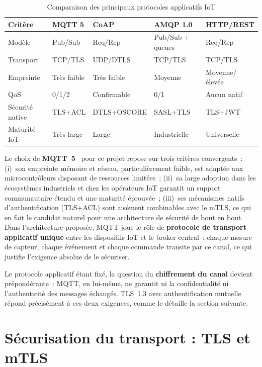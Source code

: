 \begin{table}[!htbp]
\centering
\caption{Comparaison des principaux protocoles applicatifs IoT}
\label{tab:protocoles}
\small
\begin{tabularx}{\linewidth}{|l|X|X|X|X|}
\hline
\textbf{Critère} & \textbf{MQTT 5} & \textbf{CoAP} & \textbf{AMQP 1.0} & \textbf{HTTP/REST} \\
\hline
Modèle & Pub/Sub & Req/Rep & Pub/Sub + queues & Req/Rep \\ \hline
Transport & TCP/TLS & UDP/DTLS & TCP/TLS & TCP/TLS \\ \hline
Empreinte & Très faible & Très faible & Moyenne & Moyenne/élevée \\ \hline
QoS & 0/1/2 & Confirmable & 0/1 & Aucun natif \\ \hline
Sécurité native & TLS+ACL & DTLS+OSCORE & SASL+TLS & TLS+JWT \\ \hline
Maturité IoT & Très large & Large & Industrielle & Universelle \\ \hline
\end{tabularx}
\end{table}

Le choix de \textbf{MQTT~5}~\cite{mqtt5} pour ce projet repose sur trois critères convergents~: (i)~son empreinte mémoire et réseau, particulièrement faible, est adaptée aux microcontrôleurs disposant de ressources limitées~; (ii)~sa large adoption dans les écosystèmes industriels et chez les opérateurs IoT garantit un support communautaire étendu et une maturité éprouvée~; (iii)~ses mécanismes natifs d'authentification (\acs{TLS}+\acs{ACL}) sont aisément combinables avec le mTLS, ce qui en fait le candidat naturel pour une architecture de sécurité de bout en bout. Dans l'architecture proposée, MQTT joue le rôle de \textbf{protocole de transport applicatif unique} entre les dispositifs IoT et le broker central~: chaque mesure de capteur, chaque événement et chaque commande transite par ce canal, ce qui justifie l'exigence absolue de le sécuriser.

Le protocole applicatif étant fixé, la question du \textbf{chiffrement du canal} devient prépondérante~: MQTT, en lui-même, ne garantit ni la confidentialité ni l'authenticité des messages échangés. TLS~1.3 avec authentification mutuelle répond précisément à ces deux exigences, comme le détaille la section suivante.

\section{Sécurisation du transport : TLS et mTLS}
\label{sec:ea-tls}

